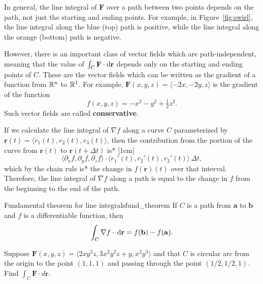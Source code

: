 \documentclass{watsonbook}
\begin{document}
In general, the line integral of $\mathbf{F}$ over a path between two
points depends on the path, not just the starting and ending points.
For example, in Figure~\ref{fig:swirl}, the line integral along the
blue (top) path is positive, while the line integral along the orange
(bottom) path is negative.

However, there is an important class of vector fields which are
path-independent, meaning that the value of $\int_C \mathbf{F} \cdot
\mathrm{d}\mathbf{r}$ depends only on the starting and ending points of $C$.
These are the vector fields which can be written as the gradient of a
function from $\mathbb{R}^n$ to $\mathbb{R}^1$. For example, $\mathbf{F}(x,y,z) =
\langle -2x, -2y, z \rangle$ is the gradient of the function
\[
  f(x,y,z) = -x^2-y^2 + \tfrac{1}{2}z^2. 
\]
Such vector fields are called \textbf{conservative}. 

If we calculate the line integral of $\nabla f$ along a curve $C$
parameterized by $\mathbf{r}(t) = \langle r_1(t), r_2(t), r_3(t) \rangle$,
then the contribution from the portion of the curve from
$\mathbf{r}(t)$ to $\mathbf{r}(t+\Delta t)$ is*
[1cm]
\[
  \langle \partial_x f, \partial_y f, \partial_z f \rangle \cdot
  \langle r_1'(t), r_2'(t), r_3'(t) \rangle \, \Delta t, 
\]
which by the chain rule is* the change in
$f(\mathbf{r})(t)$ over that interval. Therefore, the line
integral of $\nabla f$ along a path is equal to the change in $f$ from
the beginning to the end of the path.

\begin{theo}{Fundamental theorem for line integrals}{fund_theorem}
  If $C$ is a path from $\mathbf{a}$ to $\mathbf{b}$ and $f$ is a
  differentiable function, then 
  \[
    \int_C \nabla f \cdot \, {\mathrm{d}}\mathbf{r} = f(\mathbf{b}) - f(\mathbf{a}). 
  \]
\end{theo}

\begin{example}{}{}
  Suppose $\mathbf{F}(x,y,z) = \langle 2  x y^{3} z, 3  x^{2} y^{2}
  z + y, x^{2} y^{3} \rangle$ and that $C$ is circular arc from the
  origin to the point $(1,1,1)$ and passing through the point
  $(1/2,1/2,1)$. Find $\int_C \mathbf{F} \cdot d \mathbf{r}$. 
\end{example}
\end{document}
